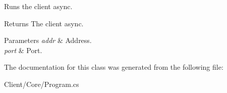 Runs the client async. 

\begin{DoxyReturn}{Returns}
The client async.
\end{DoxyReturn}

\begin{DoxyParams}{Parameters}
{\em addr} & Address.\\
\hline
{\em port} & Port.\\
\hline
\end{DoxyParams}


The documentation for this class was generated from the following file\+:\begin{DoxyCompactItemize}
\item 
Client/\+Core/Program.\+cs\end{DoxyCompactItemize}
